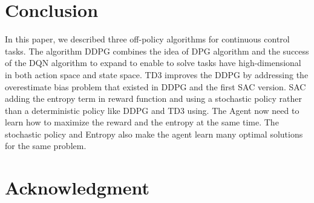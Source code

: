 %





\section{Conclusion}
In this paper, we described three off-policy algorithms for continuous control tasks. The algorithm DDPG combines the idea of DPG algorithm and the success of the DQN algorithm to expand to enable to solve tasks have high-dimensional in both action space and state space. TD3 improves the DDPG by addressing the overestimate bias problem that existed in DDPG and the first SAC version. SAC adding the entropy term in reward function and using a stochastic policy rather than a deterministic policy like DDPG and TD3 using. The Agent now need to learn how to maximize the reward and the entropy at the same time. The stochastic policy and Entropy also make the agent learn many optimal solutions for the same problem.

\section*{Acknowledgment}


